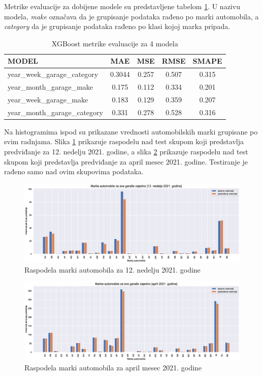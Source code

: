 \documentclass[12pt,oneside]{memoir}
\begin{document}
Metrike evaluacije za dobijene modele su predstavljene tabelom \ref{tbl: xgboost_atributi}. U nazivu modela, \textit{make} označava da je grupisanje podataka rađeno po marki automobila, a \textit{category} da je grupisanje podataka rađeno po klasi kojoj marka pripada.
\begin{table}
\centering
\caption{XGBoost metrike evaluacije za 4 modela}
\label{tbl: xgboost_atributi}
\begin{tabular}{ |l|c|c|c|c|} 
\hline
MODEL & MAE & MSE & RMSE & SMAPE \\
\hline
year\_week\_garage\_category & 0.3044& 0.257 & 0.507 & 0.315 \\ 
year\_month\_garage\_make & 0.175 & 0.112 & 0.334 & 0.201 \\
year\_week\_garage\_make & 0.183 & 0.129 & 0.359 & 0.207 \\
year\_month\_garage\_category & 0.331 & 0.278 & 0.528 & 0.316 \\
\hline
\end{tabular}
\end{table}
Na histogramima ispod su prikazane vrednosti automobilskih marki grupisane po svim radnjama. Slika \ref{fig: marke_nedelja} prikazuje raspodelu nad test skupom koji predstavlja predviđanje za 12. nedelju 2021. godine, a slika \ref{fig: marke_mesec} prikazuje raspodelu nad test skupom koji predstavlja predviđanje za april mesec 2021. godine. Testiranje je rađeno samo nad ovim skupovima podataka.
\begin{figure}[!ht]
  \centering
  \includegraphics[width=1\textwidth]{./grafici/year_week_garage_make_train_on_all_available_202112.eps}
  \caption{Raspodela marki automobila za 12. nedelju 2021. godine} 
  \label{fig: marke_nedelja}
\end{figure}

\begin{figure}[!ht]
  \centering
  \includegraphics[width=1\textwidth]{./grafici/year_month_garage_make_train_on_all_available_202104.eps}
  \caption{Raspodela marki automobila za april mesec 2021. godine}
  \label{fig: marke_mesec}
\end{figure}
\end{document}
